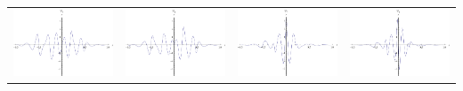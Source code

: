 \documentclass{article}
\begin{document}
\begin{landscape}
\begin{tabular}{cccc}
\includegraphics[width=5.0cm]{septic_wavelet_5.pdf}& \includegraphics[width=5.0cm]{septic_wavelet_6.pdf}& \includegraphics[width=5.0cm]{septic_wavelet_7.pdf}& \includegraphics[width=5.0cm]{septic_wavelet_8.pdf} \\
\end{tabular} 
 \end{landscape}
\end{document}
